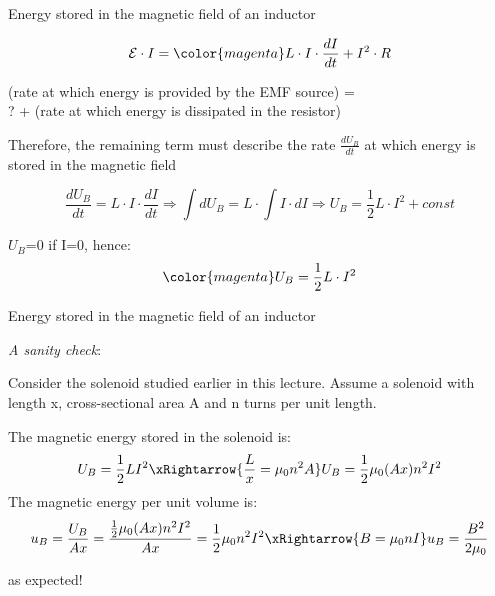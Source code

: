 %
%
%

\begin{frame}{Energy stored in the magnetic field of an inductor}

\begin{equation*}
  \mathcal{E} \cdot I = {\color{magenta} L \cdot I \cdot \frac{dI}{dt} } + I^2 \cdot R
\end{equation*}

\begin{center}
   (rate at which energy is provided by the EMF source) = \\
      ? + (rate at which energy is dissipated in the resistor)
\end{center}

Therefore, the remaining term must describe the rate $\displaystyle \frac{dU_B}{dt}$
at which energy is stored in the magnetic field

\begin{equation*}
  \frac{dU_B}{dt} = L \cdot I \cdot \frac{dI}{dt} \Rightarrow
  \int dU_B = L \cdot \int I \cdot dI \Rightarrow
   U_B = \frac{1}{2} L \cdot I^2 + const
\end{equation*}

\vspace{0.2cm}
$U_B$=0 if I=0, hence:
\begin{equation*}
{\color{magenta}
   U_B = \frac{1}{2} L \cdot I^2
}
\end{equation*}

\end{frame}

%
%
%

\begin{frame}{Energy stored in the magnetic field of an inductor}

{\it A sanity check}:\\

\vspace{0.3cm}

Consider the solenoid studied earlier in this lecture. Assume a solenoid with length x,
cross-sectional area A and n turns per unit length.\\

\vspace{0.2cm}

The magnetic energy stored in the solenoid is:
\begin{equation*}
  U_B = \frac{1}{2} L I^2 \xRightarrow{\frac{L}{x} = \mu_0 n^2 A}
  U_B = \frac{1}{2} \mu_0 (Ax) n^2 I^2
\end{equation*}
The magnetic energy per unit volume is:
\begin{equation*}
  u_B = \frac{U_B}{Ax} = \frac{\frac{1}{2} \mu_0 (Ax) n^2 I^2}{Ax} =
           \frac{1}{2} \mu_0 n^2 I^2 \xRightarrow{B = \mu_0 n I}
  u_B = \frac{B^2}{2\mu_0}
\end{equation*}

as expected!

\end{frame}

